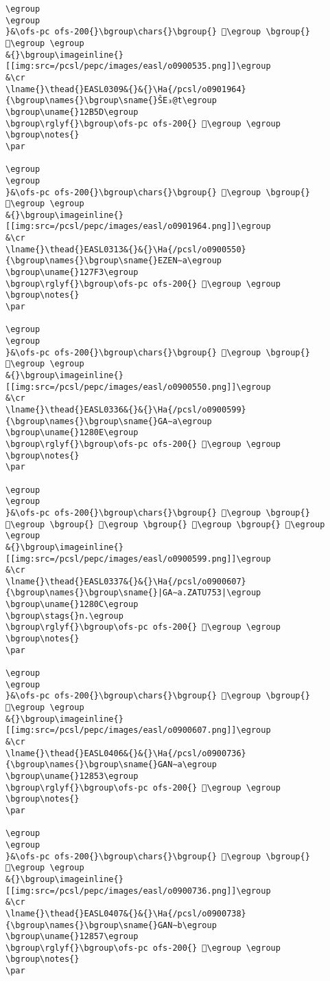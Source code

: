 \begin{verbatim}
\egroup
\egroup
}&\ofs-pc ofs-200{}\bgroup\chars{}\bgroup{} 𒟨\egroup \bgroup{} 𒟩\egroup \egroup
&{}\bgroup\imageinline{}[[img:src=/pcsl/pepc/images/easl/o0900535.png]]\egroup
&\cr
\lname{}\thead{}EASL0309&{}&{}\Ha{/pcsl/o0901964}{\bgroup\names{}\bgroup\sname{}ŠE₃@t\egroup
\bgroup\uname{}12B5D\egroup
\bgroup\rglyf{}\bgroup\ofs-pc ofs-200{} 𒭝\egroup \egroup
\bgroup\notes{}
\par 

\egroup
\egroup
}&\ofs-pc ofs-200{}\bgroup\chars{}\bgroup{} 𒭛\egroup \bgroup{} 𒭝\egroup \egroup
&{}\bgroup\imageinline{}[[img:src=/pcsl/pepc/images/easl/o0901964.png]]\egroup
&\cr
\lname{}\thead{}EASL0313&{}&{}\Ha{/pcsl/o0900550}{\bgroup\names{}\bgroup\sname{}EZEN∼a\egroup
\bgroup\uname{}127F3\egroup
\bgroup\rglyf{}\bgroup\ofs-pc ofs-200{} 𒟳\egroup \egroup
\bgroup\notes{}
\par 

\egroup
\egroup
}&\ofs-pc ofs-200{}\bgroup\chars{}\bgroup{} 𒠁\egroup \bgroup{} 𒟳\egroup \egroup
&{}\bgroup\imageinline{}[[img:src=/pcsl/pepc/images/easl/o0900550.png]]\egroup
&\cr
\lname{}\thead{}EASL0336&{}&{}\Ha{/pcsl/o0900599}{\bgroup\names{}\bgroup\sname{}GA∼a\egroup
\bgroup\uname{}1280E\egroup
\bgroup\rglyf{}\bgroup\ofs-pc ofs-200{} 𒠎\egroup \egroup
\bgroup\notes{}
\par 

\egroup
\egroup
}&\ofs-pc ofs-200{}\bgroup\chars{}\bgroup{} 𒠊\egroup \bgroup{} 𒠋\egroup \bgroup{} 𒠍\egroup \bgroup{} 𒠎\egroup \bgroup{} 𒠏\egroup \egroup
&{}\bgroup\imageinline{}[[img:src=/pcsl/pepc/images/easl/o0900599.png]]\egroup
&\cr
\lname{}\thead{}EASL0337&{}&{}\Ha{/pcsl/o0900607}{\bgroup\names{}\bgroup\sname{}|GA∼a.ZATU753|\egroup
\bgroup\uname{}1280C\egroup
\bgroup\stags{}n.\egroup
\bgroup\rglyf{}\bgroup\ofs-pc ofs-200{} 𒠌\egroup \egroup
\bgroup\notes{}
\par 

\egroup
\egroup
}&\ofs-pc ofs-200{}\bgroup\chars{}\bgroup{} 𒠌\egroup \bgroup{} 𒠐\egroup \egroup
&{}\bgroup\imageinline{}[[img:src=/pcsl/pepc/images/easl/o0900607.png]]\egroup
&\cr
\lname{}\thead{}EASL0406&{}&{}\Ha{/pcsl/o0900736}{\bgroup\names{}\bgroup\sname{}GAN∼a\egroup
\bgroup\uname{}12853\egroup
\bgroup\rglyf{}\bgroup\ofs-pc ofs-200{} 𒡓\egroup \egroup
\bgroup\notes{}
\par 

\egroup
\egroup
}&\ofs-pc ofs-200{}\bgroup\chars{}\bgroup{} 𒡒\egroup \bgroup{} 𒡓\egroup \egroup
&{}\bgroup\imageinline{}[[img:src=/pcsl/pepc/images/easl/o0900736.png]]\egroup
&\cr
\lname{}\thead{}EASL0407&{}&{}\Ha{/pcsl/o0900738}{\bgroup\names{}\bgroup\sname{}GAN∼b\egroup
\bgroup\uname{}12857\egroup
\bgroup\rglyf{}\bgroup\ofs-pc ofs-200{} 𒡗\egroup \egroup
\bgroup\notes{}
\par 


\end{verbatim}
